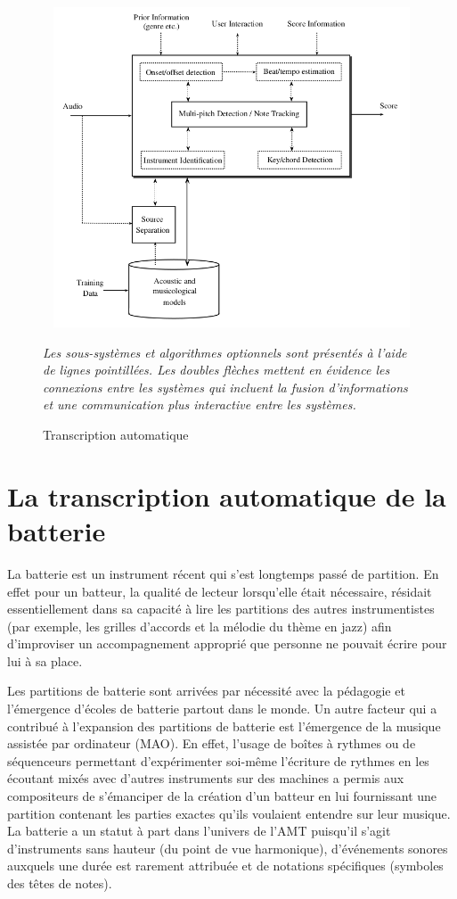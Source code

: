 \begin{figure}[!h]
	\centering
	\includegraphics[height=95mm, width=130mm]{z_images/1_contexte/1_general_process.png}
	\caption{Transcription automatique}
	\label{AMT_presentation}
	\textit{Les sous-systèmes et algorithmes optionnels sont présentés à l'aide de lignes pointillées. Les doubles flèches mettent en évidence les connexions entre les systèmes qui incluent la fusion d'informations et une communication plus interactive entre les systèmes.}
\end{figure} %
{}

\section{La transcription automatique de la batterie}
La batterie est un instrument récent qui s’est longtemps passé de partition. En effet pour un batteur, la qualité de lecteur lorsqu’elle était nécessaire, résidait essentiellement dans sa capacité à lire les partitions des autres instrumentistes (par exemple, les grilles d’accords et la mélodie du thème en jazz) afin d’improviser un accompagnement approprié que personne ne pouvait écrire pour lui à sa place.

Les partitions de batterie sont arrivées par nécessité avec la pédagogie et l’émergence d’écoles de batterie partout dans le monde. 
Un autre facteur qui a contribué à l’expansion des partitions de batterie est l’émergence de la musique assistée par ordinateur (MAO). En effet, l’usage de boîtes à rythmes ou de séquenceurs permettant d’expérimenter soi-même l’écriture de rythmes en les écoutant mixés avec d’autres instruments sur des machines a permis  aux compositeurs de s’émanciper de la création d’un batteur en lui fournissant une partition contenant les parties exactes qu’ils voulaient entendre sur leur musique.\\
La batterie a un statut à part dans l’univers de l’AMT puisqu'il s'agit d'instruments sans hauteur (du point de vue harmonique), d'événements sonores auxquels une durée est rarement attribuée et de notations spécifiques (symboles des têtes de notes).

